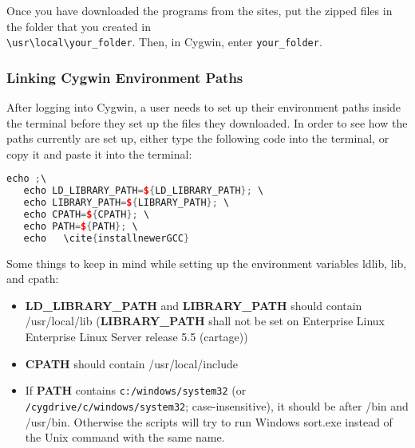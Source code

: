 Once you have downloaded the programs from the sites, put the zipped files in the folder that you created in \\ \texttt{\textbackslash{usr}\textbackslash{local}\textbackslash{your\_folder}}. Then, in Cygwin, enter \texttt{your\_folder}. 










	\subsubsection{Linking Cygwin Environment Paths}
After logging into Cygwin, a user needs to set up their environment paths inside the terminal before they set up the files they downloaded. In order to see how the paths currently are set up, either type the following code into the terminal, or copy it and paste it into the terminal: 

\begin{center}\begin{minipage}{0.9\linewidth}

\begin{lstlisting}[language=c++, caption=Adapted from \cite{installnewerGCC}, captionpos=b]
   echo ;\
   echo LD_LIBRARY_PATH=${LD_LIBRARY_PATH}; \
   echo LIBRARY_PATH=${LIBRARY_PATH}; \
   echo CPATH=${CPATH}; \
   echo PATH=${PATH}; \
   echo   \cite{installnewerGCC}
\end{lstlisting}
\end{minipage}\end{center}

Some things to keep in mind while setting up the environment variables \gls{ldlib}, \gls{lib}, and \gls{cpath}:
\begin{itemize}
\item \textbf{LD\_LIBRARY\_PATH} and \textbf{LIBRARY\_PATH} should contain /usr/local/lib (\textbf{LIBRARY\_PATH} shall not be set on Enterprise Linux Enterprise Linux Server release 5.5 (cartage)) 
\item \textbf{CPATH} should contain /usr/local/include
\item If \textbf{PATH} contains \texttt{c:/windows/system32} (or \texttt{/cygdrive/c/windows/system32}; case-insensitive), it should be after /bin and /usr/bin. Otherwise the scripts will try to run Windows sort.exe instead of the Unix command with the same name.
\end{itemize}

